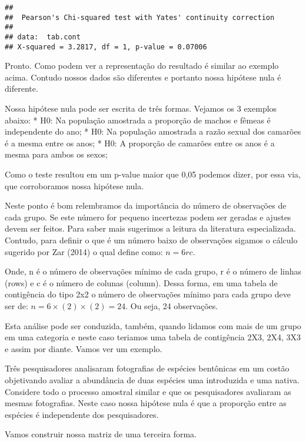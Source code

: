 \documentclass[titlepage, oneside, openany, a4paper]{book}
\begin{document}
\begin{verbatim}
## 
##  Pearson's Chi-squared test with Yates' continuity correction
## 
## data:  tab.cont
## X-squared = 3.2817, df = 1, p-value = 0.07006
\end{verbatim}

Pronto. Como podem ver a representação do resultado é similar ao exemplo acima. Contudo nossos dados são diferentes e portanto nossa hipótese nula é diferente.

Nossa hipótese nula pode ser escrita de três formas. Vejamos os 3 exemplos abaixo:
* H0: Na população amostrada a proporção de machos e fêmeas é independente do ano;
* H0: Na população amostrada a razão sexual dos camarões é a mesma entre os anos;
* H0: A proporção de camarões entre os anos é a mesma para ambos os sexos;

Como o teste resultou em um p-value maior que 0,05 podemos dizer, por essa via, que corroboramos nossa hipótese nula.

Neste ponto é bom relembramos da importância do número de observações de cada grupo. Se este número for pequeno incertezas podem ser geradas e ajustes devem ser feitos. Para saber mais sugerimos a leitura da literatura especializada. Contudo, para definir o que é um número baixo de observações sigamos o cálculo sugerido por Zar (2014) o qual define como: \(n = 6rc\).

Onde, n é o número de observações mínimo de cada grupo, r é o número de linhas (rows) e c é o número de colunas (column). Dessa forma, em uma tabela de contigência do tipo 2x2 o número de observações mínimo para cada grupo deve ser de: \(n = 6 \times (2) \times (2) = 24\). Ou seja, 24 observações.

Esta análise pode ser conduzida, também, quando lidamos com mais de um grupo em uma categoria e neste caso teriamos uma tabela de contigência 2X3, 2X4, 3X3 e assim por diante. Vamos ver um exemplo.

Três pesquisadores analisaram fotografias de espécies bentônicas em um costão objetivando avaliar a abundância de duas espécies uma introduzida e uma nativa. Considere todo o processo amostral similar e que os pesquisadores avaliaram as mesmas fotografias. Neste caso nossa hipótese nula é que a proporção entre as espécies é independente dos pesquisadores.

Vamos construir nossa matriz de uma terceira forma.
\end{document}
